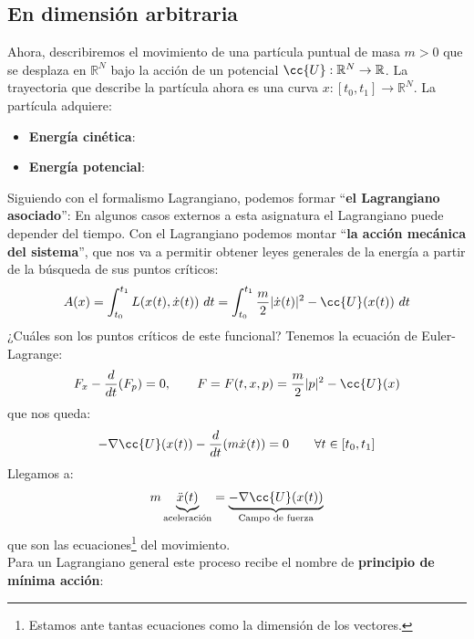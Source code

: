 \subsection{En dimensión arbitraria}
\noindent
Ahora, describiremos el movimiento de una partícula puntual de masa $m>0$ que se desplaza en $\mathbb{R}^N$ bajo la acción de un potencial $\cc{U}:\mathbb{R}^N\to \mathbb{R}$. La trayectoria que describe la partícula ahora es una curva $x:[t_0,t_1]\to \mathbb{R}^N$. La partícula adquiere:
\begin{itemize}
    \item \textbf{Energía cinética}: 
    \item \textbf{Energía potencial}:
\end{itemize}
Siguiendo con el formalismo Lagrangiano, podemos formar ``\textbf{el Lagrangiano asociado}'':
En algunos casos externos a esta asignatura el Lagrangiano puede depender del tiempo. Con el Lagrangiano podemos montar ``\textbf{la acción mecánica del sistema}'', que nos va a permitir obtener leyes generales de la energía a partir de la búsqueda de sus puntos críticos:
\begin{equation*}
    A(x) = \int_{t_0}^{t_1} L(x(t), \dot{x}(t))~dt  = \int_{t_0}^{t_1} \frac{m}{2}|\dot{x}(t)|^2 - \cc{U}(x(t))~dt 
\end{equation*}
¿Cuáles son los puntos críticos de este funcional? Tenemos la ecuación de Euler-Lagrange:
\begin{equation*}
    F_x - \frac{d}{dt}(F_p) = 0, \qquad F=F(t,x,p) = \frac{m}{2}|p|^2 - \cc{U}(x)
\end{equation*}
que nos queda:
\begin{equation*}
    -\nabla\cc{U}(x(t)) - \frac{d}{dt}(m\dot{x}(t)) = 0 \qquad \forall t\in [t_0,t_1]
\end{equation*}
Llegamos a:
\begin{equation*}
    m\underbrace{\ddot{x}(t)}_{\text{aceleración}} = \underbrace{-\nabla \cc{U}(x(t))}_{\text{Campo de fuerza}}
\end{equation*}
que son las ecuaciones\footnote{Estamos ante tantas ecuaciones como la dimensión de los vectores.} del movimiento.\\

\noindent
Para un Lagrangiano general este proceso recibe el nombre de \textbf{principio de mínima acción}:\\

